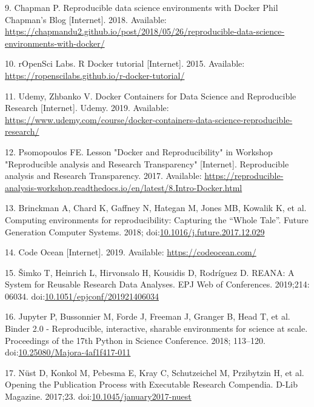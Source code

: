 \documentclass[10pt,letterpaper]{article}
\begin{document}
\leavevmode\hypertarget{ref-chapman_reproducible_2018}{}%
9. Chapman P. Reproducible data science environments with Docker Phil
Chapman's Blog {[}Internet{]}. 2018. Available:
\url{https://chapmandu2.github.io/post/2018/05/26/reproducible-data-science-environments-with-docker/}

\leavevmode\hypertarget{ref-ropensci_labs_r_2015}{}%
10. rOpenSci Labs. R Docker tutorial {[}Internet{]}. 2015. Available:
\url{https://ropenscilabs.github.io/r-docker-tutorial/}

\leavevmode\hypertarget{ref-udemy_docker_2019}{}%
11. Udemy, Zhbanko V. Docker Containers for Data Science and
Reproducible Research {[}Internet{]}. Udemy. 2019. Available:
\url{https://www.udemy.com/course/docker-containers-data-science-reproducible-research/}

\leavevmode\hypertarget{ref-psomopoulos_lesson_2017}{}%
12. Psomopoulos FE. Lesson "Docker and Reproducibility" in Workshop
"Reproducible analysis and Research Transparency" {[}Internet{]}.
Reproducible analysis and Research Transparency. 2017. Available:
\url{https://reproducible-analysis-workshop.readthedocs.io/en/latest/8.Intro-Docker.html}

\leavevmode\hypertarget{ref-brinckman_computing_2018}{}%
13. Brinckman A, Chard K, Gaffney N, Hategan M, Jones MB, Kowalik K, et
al. Computing environments for reproducibility: Capturing the ``Whole
Tale''. Future Generation Computer Systems. 2018;
doi:\href{https://doi.org/10.1016/j.future.2017.12.029}{10.1016/j.future.2017.12.029}

\leavevmode\hypertarget{ref-code_ocean_2019}{}%
14. Code Ocean {[}Internet{]}. 2019. Available:
\url{https://codeocean.com/}

\leavevmode\hypertarget{ref-simko_reana_2019}{}%
15. Šimko T, Heinrich L, Hirvonsalo H, Kousidis D, Rodríguez D. REANA: A
System for Reusable Research Data Analyses. EPJ Web of Conferences.
2019;214: 06034.
doi:\href{https://doi.org/10.1051/epjconf/201921406034}{10.1051/epjconf/201921406034}

\leavevmode\hypertarget{ref-jupyter_binder_2018}{}%
16. Jupyter P, Bussonnier M, Forde J, Freeman J, Granger B, Head T, et
al. Binder 2.0 - Reproducible, interactive, sharable environments for
science at scale. Proceedings of the 17th Python in Science Conference.
2018; 113--120.
doi:\href{https://doi.org/10.25080/Majora-4af1f417-011}{10.25080/Majora-4af1f417-011}

\leavevmode\hypertarget{ref-nust_opening_2017}{}%
17. Nüst D, Konkol M, Pebesma E, Kray C, Schutzeichel M, Przibytzin H,
et al. Opening the Publication Process with Executable Research
Compendia. D-Lib Magazine. 2017;23.
doi:\href{https://doi.org/10.1045/january2017-nuest}{10.1045/january2017-nuest}
\end{document}
